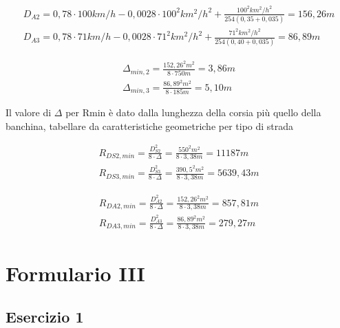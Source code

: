 \documentclass[
a4paper,
12pt, 
twoside]{scrbook}
\begin{document}
{{{{{{{{   \begin{equation}
   	\begin{aligned}
   		D_{A2}=0,78\cdot 100km/h-0,0028\cdot 100^2km^2/h^2+\frac{100^2km^2/h^2}{254(0,35+0,035)}=156,26m\\
   		D_{A3}=0,78\cdot 71km/h-0,0028\cdot 71^2km^2/h^2+\frac{71^2km^2/h^2}{254(0,40+0,035)}=86,89m
   	\end{aligned} 	
   \end{equation}
   
   \begin{equation}
   	\begin{aligned}
   		\Delta_{min,2}=\frac{152,26^2m^2}{8\cdot 750m}=3,86m\\
   		\Delta_{min,3}=\frac{86,89^2m^2}{8\cdot 185m}=5,10m
   	\end{aligned} 	
   \end{equation}
   
   \begin{boxF}
   	Il valore di $\Delta$ per Rmin è dato dalla lunghezza della corsia più quello della banchina, tabellare da caratteristiche geometriche per tipo di strada
   \end{boxF}
   
   \begin{equation}
   	\begin{aligned}
   		R_{DS2,min}=\frac{D^2_{S2}}{8\cdot \Delta}=\frac{550^2m^2}{8\cdot 3,38m}=11187m\\
   		R_{DS3,min}=\frac{D^2_{S3}}{8\cdot \Delta}=\frac{390,5^2m^2}{8\cdot 3,38m}=5639,43m
   	\end{aligned} 	
   \end{equation}
   
   \begin{equation}
   	\begin{aligned}
   		R_{DA2,min}=\frac{D^2_{A2}}{8\cdot \Delta}=\frac{152,26^2m^2}{8\cdot 3,38m}=857,81m\\
   		R_{DA3,min}=\frac{D^2_{A3}}{8\cdot \Delta}=\frac{86,89^2m^2}{8\cdot 3,38m}=279,27m
   	\end{aligned} 	
   \end{equation}
   
   \chapter{Formulario III}
   
   \section{Esercizio 1}
   
}}}}}}}}
\end{document}
